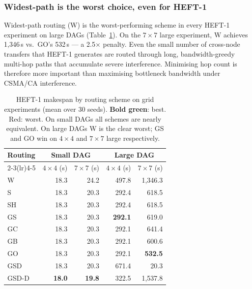 \documentclass[11pt]{article}
\newcommand{\win}[1]{\textcolor{green!50!black}{\textbf{#1}}}
\newcommand{\bad}[1]{\textcolor{red!70!black}{#1}}
\begin{document}
\subsubsection{Widest-path is the worst choice, even for HEFT-1}

Widest-path routing (W) is the worst-performing scheme in every HEFT-1 experiment
on large DAGs (Table~\ref{tab:routing-h1}).  On the $7\times7$ large experiment,
W achieves 1{,}346\,s vs.\ GO's 532\,s --- a 2.5$\times$ penalty.  Even the
small number of cross-node transfers that HEFT-1 generates are routed through
long, bandwidth-greedy multi-hop paths that accumulate severe interference.
Minimising hop count is therefore more important than maximising bottleneck
bandwidth under CSMA/CA interference.

\begin{table}[H]
\centering
\small
\setlength{\tabcolsep}{3.5pt}
\begin{tabular}{l r r r r}
\toprule
\textbf{Routing}
  & \multicolumn{2}{c}{\textbf{Small DAG}}
  & \multicolumn{2}{c}{\textbf{Large DAG}} \\
\cmidrule(lr){2-3}\cmidrule(lr){4-5}
  & $4\times4$ (s) & $7\times7$ (s) & $4\times4$ (s) & $7\times7$ (s) \\
\midrule
\bad{W}     & 18.3 & 24.2 & \bad{497.8} & \bad{1{,}346.3} \\
S           & 18.3 & 20.3 & 292.4       & 618.5           \\
SH          & 18.3 & 20.3 & 292.4       & 618.5           \\
GS          & 18.3 & 20.3 & \win{292.1} & 619.0           \\
GC          & 18.3 & 20.3 & 292.1       & 641.4           \\
GB          & 18.3 & 20.3 & 292.1       & 600.6           \\
GO          & 18.3 & 20.3 & 292.1       & \win{532.5}     \\
GSD         & 18.3 & 20.3 & \bad{671.4} & 20.3            \\
GSD-D       & \win{18.0} & \win{19.8} & 322.5 & 1{,}537.8 \\
\bottomrule
\end{tabular}
\caption{HEFT-1 makespan by routing scheme on grid experiments (mean over 30
seeds).  \win{Bold green}: best.  \bad{Red}: worst.
On small DAGs all schemes are nearly equivalent.  On large DAGs W is the clear
worst; GS and GO win on $4\times4$ and $7\times7$ large respectively.}
\label{tab:routing-h1}
\end{table}
\end{document}
